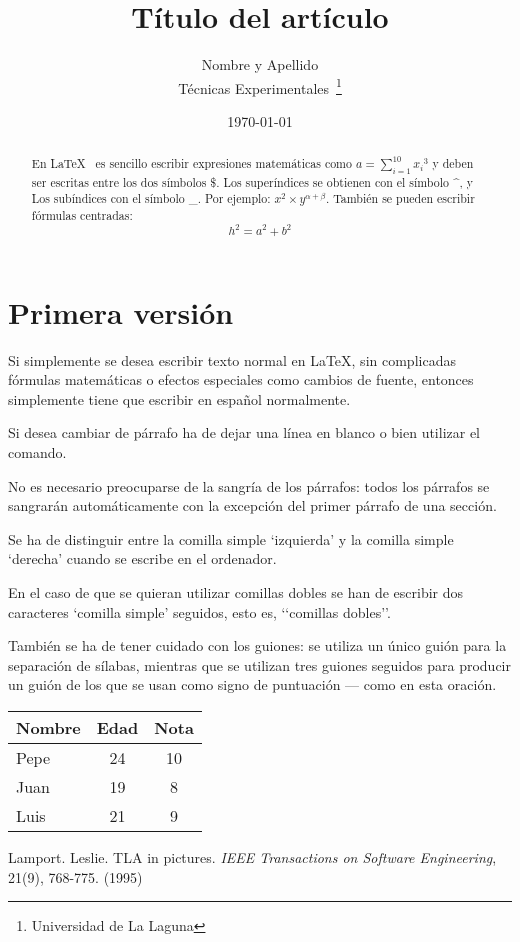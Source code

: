 \documentclass[a4paper,12pt]{article}
\begin{document}
\title{Título del artículo}
\author{Nombre y Apellido \\
        Técnicas Experimentales~\footnote{Universidad de La Laguna}
        }
\date{\today}
\maketitle
\begin{abstract}
  En \LaTeX{}~\cite{Lam:86} es sencillo escribir expresiones 
  matemáticas como $a=\sum_{i=1}^{10} {x_i}^{3}$
  y deben ser escritas entre los dos símbolos \$.
  Los superíndices se obtienen con el símbolo \^{}, y
  Los subíndices con el símbolo \_.
  Por ejemplo: $x^2 \times y^{\alpha + \beta}$.
  También se pueden escribir fórmulas centradas:
  \[h^2=a^2 + b^2 \]
\end{abstract}

\section{Primera versión}
Si simplemente se desea escribir texto normal en LaTeX,
sin complicadas f\'ormulas matem\'aticas o efectos especiales 
como cambios de fuente, entonces simplemente tiene que escribir 
en espa\~nol normalmente.\par


Si desea cambiar de p\'arrafo ha de dejar una l\'inea en blanco o bien
utilizar el comando. \par


No es necesario preocuparse de la sangr\'ia de los p\'arrafos:
todos los p\'arrafos se sangrar\'an autom\'aticamente con la excepci\'on
del primer p\'arrafo de una secci\'on.


Se ha de distinguir entre la comilla simple ‘izquierda’
y la comilla simple ‘derecha’ cuando se escribe en el ordenador.


En el caso de que se quieran utilizar comillas dobles se han de
escribir dos caracteres ‘comilla simple’ seguidos, esto es,
‘‘comillas dobles’’. 


Tambi\'en se ha de tener cuidado con los guiones: se utiliza un único
gui\'on para la separaci\'on de s\'ilabas, mientras que se utilizan
tres guiones seguidos para producir un gui\'on de los que se usan
como signo de puntuaci\'on --- como en esta oraci\'on. 

\bigskip
\begin{tabular}{|l|c|c|}
\hline
   Nombre & Edad  & Nota  \\ \hline
   Pepe   &   24  &   10  \\ \hline
   Juan   &   19  &    8  \\ \hline
   Luis   &   21  &    9  \\ \hline
\end{tabular}

\begin{thebibliography}{00}
  Lamport. Leslie.
  TLA in pictures.
  \emph{IEEE Transactions on Software Engineering},
  21(9), 768-775.
  (1995)
\end{thebibliography}
\end{document}
